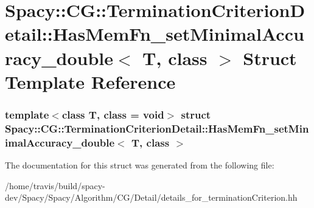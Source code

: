 \hypertarget{structSpacy_1_1CG_1_1TerminationCriterionDetail_1_1HasMemFn__setMinimalAccuracy__double}{\section{\-Spacy\-:\-:\-C\-G\-:\-:\-Termination\-Criterion\-Detail\-:\-:\-Has\-Mem\-Fn\-\_\-set\-Minimal\-Accuracy\-\_\-double$<$ \-T, class $>$ \-Struct \-Template \-Reference}
\label{structSpacy_1_1CG_1_1TerminationCriterionDetail_1_1HasMemFn__setMinimalAccuracy__double}
}
\subsubsection*{template$<$class T, class = void$>$ struct Spacy\-::\-C\-G\-::\-Termination\-Criterion\-Detail\-::\-Has\-Mem\-Fn\-\_\-set\-Minimal\-Accuracy\-\_\-double$<$ T, class $>$}



\-The documentation for this struct was generated from the following file\-:\begin{DoxyCompactItemize}
\item 
/home/travis/build/spacy-\/dev/\-Spacy/\-Spacy/\-Algorithm/\-C\-G/\-Detail/details\-\_\-for\-\_\-termination\-Criterion.\-hh\end{DoxyCompactItemize}
